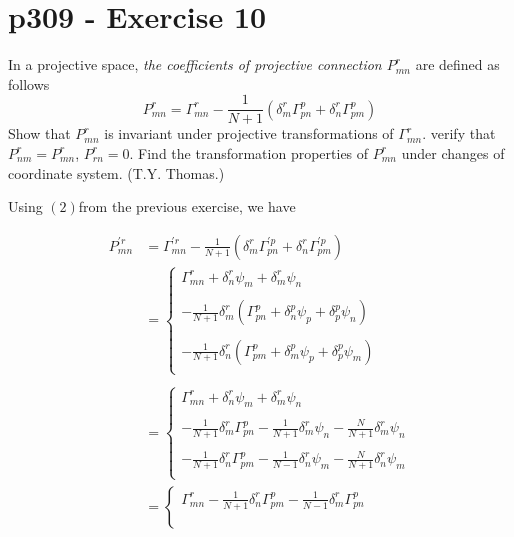 \section{p309 - Exercise 10}
\begin{tcolorbox}
In a projective space, \textit{the coefficients of projective connection $P^{r}_{mn}$ }are defined as follows
$$P^{r}_{mn} = \Gamma ^{r}_{mn}-\frac{1}{N+1}\left(\delta^r_m \Gamma^p_{pn}+  \delta^r_n \Gamma^p_{pm} \right)$$
Show that $P^{r}_{mn} $ is invariant under projective transformations of $\Gamma^{r}_{mn}$. verify that $P^{r}_{nm}=P^{r}_{mn}$, $P^{r}_{rn}=0$. Find the transformation properties of $P^{r}_{mn}$ under changes of coordinate system. (T.Y. Thomas.)
\end{tcolorbox}
Using $(2)$from the previous exercise, we have

\begin{align}
P^{'r}_{mn} &= \Gamma ^{'r}_{mn}-\frac{1}{N+1}\left(\delta^r_m \Gamma^{'p}_{pn}+  \delta^r_n \Gamma^{'p}_{pm} \right)\\
&=\left\{\begin{matrix}
 \Gamma^{r}_{mn} +\delta^r_n\psi_m +\delta^r_m\psi_n\\\\
 -\frac{1}{N+1}\delta^r_m \left(\Gamma^{p}_{pn} +\delta^p_n\psi_p +\delta^p_p\psi_n\right)\\\\
 -\frac{1}{N+1}  \delta^r_n \left(\Gamma^{p}_{pm} +\delta^p_m\psi_p +\delta^p_p\psi_m \right)\\
\end{matrix}\right.\\\\
&=\left\{\begin{matrix}
 \Gamma^{r}_{mn} +\delta^r_n\psi_m +\delta^r_m\psi_n\\\\
 -\frac{1}{N+1}\delta^r_m \Gamma^{p}_{pn} -\frac{1}{N+1}\delta^r_m \psi_n -\frac{N}{N+1}\delta^r_m \psi_n\\\\
 -\frac{1}{N+1}  \delta^r_n \Gamma^{p}_{pm} -\frac{1}{N-1}  \delta^r_n \psi_m -\frac{N}{N+1}  \delta^r_n \psi_m \\
\end{matrix}\right.\\
&=\left\{\begin{matrix}
 \Gamma^{r}_{mn} -\frac{1}{N+1}  \delta^r_n \Gamma^{p}_{pm}-\frac{1}{N-1}\delta^r_m \Gamma^{p}_{pn}\\\\

\end{matrix}
\end{align}
